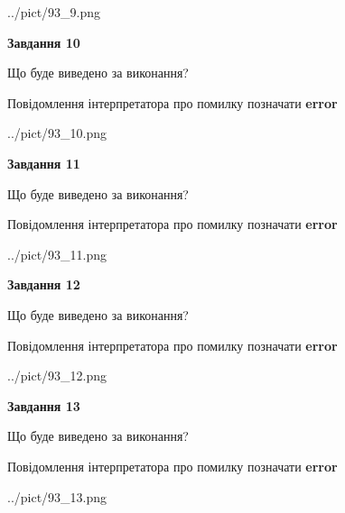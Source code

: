 \documentclass[11pt, ukrainian]{article}
\begin{document}
{\begin {large}
\begin{center}
	{../pict/93_9.png}
\end{center}
\newpage

{\begin {center}\textbf{Завдання 10}\end {center}}\par
Що буде виведено за виконання? \par
Повідомлення інтерпретатора про помилку позначати \textbf{error}

\begin{center}
	{../pict/93_10.png}
\end{center}
\newpage

{\begin {center}\textbf{Завдання 11}\end {center}}\par
Що буде виведено за виконання? \par
Повідомлення інтерпретатора про помилку позначати \textbf{error}

\begin{center}
	{../pict/93_11.png}
\end{center}
\newpage

{\begin {center}\textbf{Завдання 12}\end {center}}\par
Що буде виведено за виконання? \par
Повідомлення інтерпретатора про помилку позначати \textbf{error}

\begin{center}
	{../pict/93_12.png}
\end{center}
\newpage

{\begin {center}\textbf{Завдання 13}\end {center}}\par
Що буде виведено за виконання? \par
Повідомлення інтерпретатора про помилку позначати \textbf{error}

\begin{center}
	{../pict/93_13.png}
\end{center}
\newpage


\end{large}}
\end{document}
